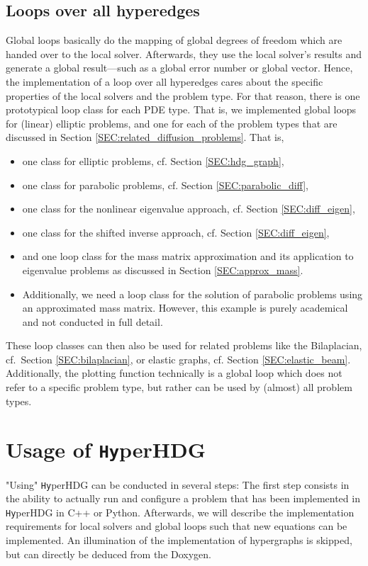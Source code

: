 \documentclass[a4paper, english, 12pt, reqno, draft]{amsart}
\theoremstyle{definition}
\theoremstyle{remark}
\numberwithin{equation}{section}
\newcommand{\hyperHDG}{{\fontfamily{pzc}\selectfont \texttt{Hy}\hspace{-1.5pt}perHDG }}
\begin{document}
\subsection{Loops over all hyperedges}
% 
Global loops basically do the mapping of global degrees of freedom which are handed over to the local solver. Afterwards, they use the local solver's results and generate a global result---such as a global error number or global vector. Hence, the implementation of a loop over all hyperedges cares about the specific properties of the local solvers and the problem type. For that reason, there is one prototypical loop class for each PDE type. That is, we implemented global loops for (linear) elliptic problems, and one for each of the problem types that are discussed in Section \ref{SEC:related_diffusion_problems}. That is,
% 
\begin{itemize}
 \item one class for elliptic problems, cf. Section \ref{SEC:hdg_graph},
 \item one class for parabolic problems, cf. Section \ref{SEC:parabolic_diff},
 \item one class for the nonlinear eigenvalue approach, cf. Section \ref{SEC:diff_eigen},
 \item one class for the shifted inverse approach, cf. Section \ref{SEC:diff_eigen},
 \item and one loop class for the mass matrix approximation and its application to eigenvalue problems as discussed in Section \ref{SEC:approx_mass}.
 \item Additionally, we need a loop class for the solution of parabolic problems using an approximated mass matrix. However, this example is purely academical and not conducted in full detail.
\end{itemize}
%
These loop classes can then also be used for related problems like the Bilaplacian, cf.\ Section \ref{SEC:bilaplacian}, or elastic graphs, cf. Section \ref{SEC:elastic_beam}. Additionally, the plotting function technically is a global loop which does not refer to a specific problem type, but rather can be used by (almost) all problem types.
% 
\section{Usage of \hyperHDG}
%
"Using" \hyperHDG can be conducted in several steps: The first step consists in the ability to actually run and configure a problem that has been implemented in \hyperHDG in C++ or Python. Afterwards, we will describe the implementation requirements for local solvers and global loops such that new equations can be implemented. An illumination of the implementation of hypergraphs is skipped, but can directly be deduced from the Doxygen.%
\end{document}
